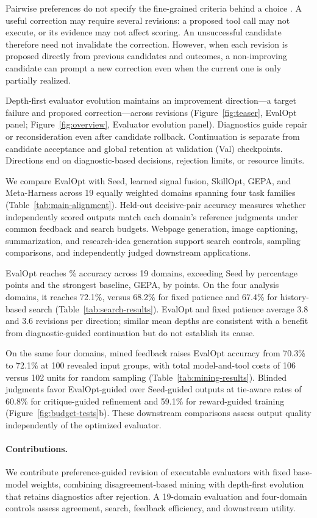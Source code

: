 Pairwise preferences do not specify the fine-grained criteria behind a choice \citep{ye2024flask,lv2026queryrubrics}.
A useful correction may require several revisions: a proposed tool call may not execute, or its evidence may not affect scoring.
An unsuccessful candidate therefore need not invalidate the correction.
However, when each revision is proposed directly from previous candidates and outcomes, a non-improving candidate can prompt a new correction even when the current one is only partially realized.

Depth-first evaluator evolution maintains an improvement direction---a target failure and proposed correction---across revisions (Figure~\ref{fig:teaser}, EvalOpt panel; Figure~\ref{fig:overview}, Evaluator evolution panel).
Diagnostics guide repair or reconsideration even after candidate rollback.
Continuation is separate from candidate acceptance and global retention at validation (Val) checkpoints.
Directions end on diagnostic-based decisions, rejection limits, or resource limits.

We compare EvalOpt with Seed, learned signal fusion, SkillOpt, GEPA, and Meta-Harness across 19 equally weighted domains spanning four task families (Table~\ref{tab:main-alignment}).
Held-out decisive-pair accuracy measures whether independently scored outputs match each domain's reference judgments under common feedback and search budgets.
Webpage generation, image captioning, summarization, and research-idea generation support search controls, sampling comparisons, and independently judged downstream applications.

EvalOpt reaches \ResultPair\% accuracy across 19 domains, exceeding Seed by \ResultSeedGain{} percentage points and the strongest baseline, GEPA, by \ResultGepaGain{} points.
On the four analysis domains, it reaches 72.1\%, versus 68.2\% for fixed patience and 67.4\% for history-based search (Table~\ref{tab:search-results}).
EvalOpt and fixed patience average 3.8 and 3.6 revisions per direction; similar mean depths are consistent with a benefit from diagnostic-guided continuation but do not establish its cause.

On the same four domains, mined feedback raises EvalOpt accuracy from 70.3\% to 72.1\% at 100 revealed input groups, with total model-and-tool costs of 106 versus 102 units for random sampling (Table~\ref{tab:mining-results}).
Blinded judgments favor EvalOpt-guided over Seed-guided outputs at tie-aware rates of 60.8\% for critique-guided refinement and 59.1\% for reward-guided training (Figure~\ref{fig:budget-tests}b).
These downstream comparisons assess output quality independently of the optimized evaluator.

\paragraph{Contributions.}
We contribute preference-guided revision of executable evaluators with fixed base-model weights, combining disagreement-based mining with depth-first evolution that retains diagnostics after rejection.
A 19-domain evaluation and four-domain controls assess agreement, search, feedback efficiency, and downstream utility.
